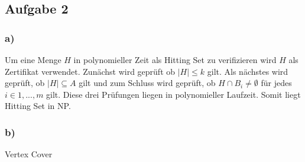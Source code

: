 \documentclass[12pt,a4paper]{article}
\begin{document}
\subsection*{Aufgabe 2}
\subsubsection*{a)}
Um eine Menge $H$ in polynomieller Zeit als Hitting Set zu verifizieren wird $H$ als Zertifikat verwendet.
Zunächst wird geprüft ob $|H|\le k$ gilt. Als nächstes wird geprüft, ob $|H|\subseteq A$ gilt und zum Schluss wird geprüft, ob $H \cap B_i \neq \emptyset$ für jedes $i \in {1,...,m}$ gilt.
Diese drei Prüfungen liegen in polynomieller Laufzeit. Somit liegt Hitting Set in NP.

\subsubsection*{b)}
Vertex Cover
\end{document}
